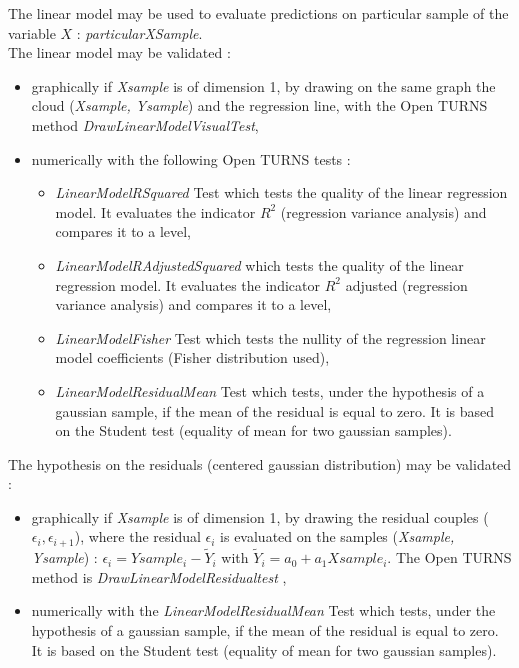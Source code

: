 The linear model may be used to evaluate predictions on particular sample of the variable $X$ :  {\itshape particularXSample}.\\

The linear model may be validated :
\begin{itemize}
\item  graphically if {\itshape Xsample}  is of dimension 1, by drawing on the same graph the cloud ({\itshape Xsample, Ysample}) and the regression line, with the Open TURNS method {\itshape DrawLinearModelVisualTest},
\item  numerically with the following Open TURNS tests :
  \begin{itemize}
  \item {\itshape LinearModelRSquared} Test which tests the quality of the linear regression model. It evaluates the indicator $R^2$ (regression variance analysis) and compares it to a level,
  \item {\itshape LinearModelRAdjustedSquared} which  tests the quality of the linear regression model. It evaluates the indicator $R^2$ adjusted (regression variance analysis) and compares it to a level,
  \item {\itshape LinearModelFisher} Test which tests the nullity of the regression linear model coefficients (Fisher distribution used),
  \item {\itshape LinearModelResidualMean} Test which tests, under the hypothesis of a gaussian sample, if the mean of the residual is equal to zero. It is based on the Student test (equality of mean for two gaussian samples).
  \end{itemize}
\end{itemize}

The hypothesis on the residuals (centered gaussian distribution) may be validated :
\begin{itemize}
\item  graphically if {\itshape Xsample} is of dimension 1, by drawing the residual couples ($\epsilon_i, \epsilon_{i+1}$), where the residual $\epsilon_i$ is evaluated on the samples  ({\itshape Xsample, Ysample}) : $\epsilon_i = Ysample_i - \tilde{Y}_i$ with $\tilde{Y}_i = a_0 + a_1 Xsample_i$. The Open TURNS method is {\itshape DrawLinearModelResidualtest} ,
\item  numerically with the {\itshape LinearModelResidualMean} Test which tests, under the hypothesis of a gaussian sample, if the mean of the residual is equal to zero. It is based on the Student test (equality of mean for two gaussian samples).
\end{itemize}

